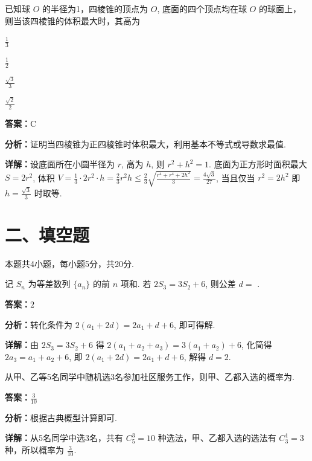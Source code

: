 \begin{question}[points=5]
已知球 $O$ 的半径为1，四棱锥的顶点为 $O$, 底面的四个顶点均在球 $O$ 的球面上，则当该四棱锥的体积最大时，其高为
\begin{choices}
  \item $\frac{1}{3}$
  \item $\frac{1}{2}$
  \item $\frac{\sqrt{3}}{3}$
  \item $\frac{\sqrt{2}}{2}$
\end{choices}
\begin{solution}
\textbf{答案：}C

\textbf{分析：}证明当四棱锥为正四棱锥时体积最大，利用基本不等式或导数求最值.

\textbf{详解：}设底面所在小圆半径为 $r$, 高为 $h$, 则 $r^2+h^2=1$. 底面为正方形时面积最大 $S=2r^2$, 体积 $V=\frac13\cdot2r^2\cdot h = \frac23 r^2 h \le \frac23 \sqrt{\frac{r^4+r^4+2h^2}{3}} = \frac{4\sqrt{3}}{27}$, 当且仅当 $r^2=2h^2$ 即 $h=\frac{\sqrt{3}}{3}$ 时取等.
\end{solution}
\end{question}

\section*{二、填空题}
本题共4小题，每小题5分，共20分.

\begin{question}[points=5]
记 $S_n$ 为等差数列 $\{a_n\}$ 的前 $n$ 项和. 若 $2S_3 = 3S_2 + 6$, 则公差 $d =$ .
\fillin[{$2$}]
\begin{solution}
\textbf{答案：}$2$

\textbf{分析：}转化条件为 $2(a_1+2d)=2a_1+d+6$, 即可得解.

\textbf{详解：}由 $2S_3=3S_2+6$ 得 $2(a_1+a_2+a_3)=3(a_1+a_2)+6$, 化简得 $2a_3=a_1+a_2+6$, 即 $2(a_1+2d)=2a_1+d+6$, 解得 $d=2$.
\end{solution}
\end{question}

\begin{question}[points=5]
从甲、乙等5名同学中随机选3名参加社区服务工作，则甲、乙都入选的概率为.
\fillin[{$\frac{3}{10}$}]
\begin{solution}
\textbf{答案：}$\frac{3}{10}$

\textbf{分析：}根据古典概型计算即可.

\textbf{详解：}从5名同学中选3名，共有 $C_5^3=10$ 种选法，甲、乙都入选的选法有 $C_3^1=3$ 种，所以概率为 $\frac{3}{10}$.
\end{solution}
\end{question}

